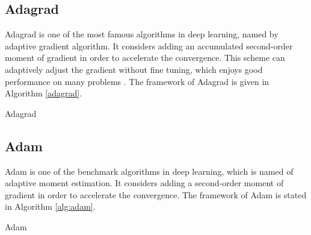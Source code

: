 \documentclass{article}
\begin{document}
\subsection{Adagrad}
Adagrad is one of the most famous algorithms in deep learning, named by adaptive gradient algorithm. It considers adding an accumulated second-order moment of gradient in order to accelerate the convergence. This scheme can adaptively adjust the gradient without fine tuning, which enjoys good performance on many problems \cite{goodfellow2016deep}. The framework of Adagrad is given in Algorithm \ref{adagrad}.
\begin{algorithm}[H]
	\caption{Adagrad}
	\begin{algorithmic}[1]\label{adagrad}
		\ENDWHILE 
	\end{algorithmic}
\end{algorithm}
\subsection{Adam}
Adam is one of the benchmark algorithms in deep learning, which is named of adaptive moment estimation. It considers adding a second-order moment of gradient in order to accelerate the convergence. The framework of Adam is stated in Algorithm \ref{alg:adam}.
\begin{algorithm}[H]
\caption{Adam}
\begin{algorithmic}[1]\label{alg:adam}
\ENDWHILE
\end{algorithmic}
\end{algorithm}
\end{document}
